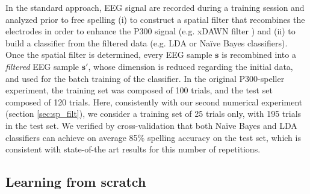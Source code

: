 \documentclass[conference]{IEEEtran}
\begin{document}
In the standard approach, EEG signal are recorded during a training session and analyzed prior to free spelling 
(i) to construct a spatial filter that recombines the electrodes
in order to enhance the P300 signal (e.g. xDAWN filter \cite{Rivet09}) and 
(ii) to build a classifier from the filtered data (e.g. LDA \cite{Krusienski08} or Na\"ive Bayes \cite{Ang12,Maby10} classifiers).
Once the spatial filter is determined,
every EEG sample $\mathbf{s}$ is recombined into a \emph{filtered} EEG sample $\mathbf{s}'$,
whose dimension is reduced regarding the initial data,
and used for the batch training of the classifier. 
In the original P300-speller experiment, the training set was composed of
100 trials, and the test set composed of 120 trials.
Here, consistently with our second numerical experiment (section \ref{sec:sp_filt}), we consider a training set of 25 trials only, with 195 trials in the test set.
We verified by cross-validation that both Na\"ive Bayes and LDA classifiers can achieve on average
85\% spelling accuracy  on the test set, which is consistent with state-of-the art results for this number of repetitions.

\subsection{Learning from scratch}
\end{document}
